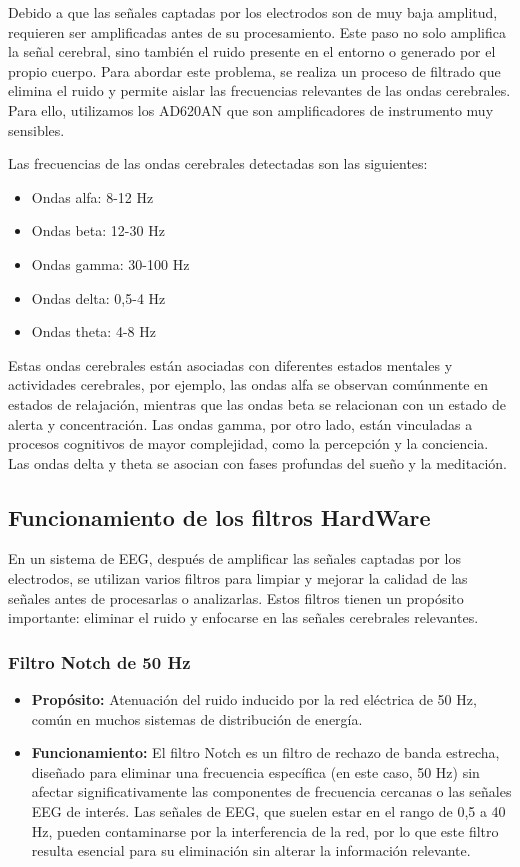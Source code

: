 \documentclass{article}
\begin{document}
Debido a que las señales captadas por los electrodos son de muy baja amplitud, requieren ser amplificadas antes de su procesamiento. Este paso no solo amplifica la señal cerebral, sino también el ruido presente en el entorno o generado por el propio cuerpo. Para abordar este problema, se realiza un proceso de filtrado que elimina el ruido y permite aislar las frecuencias relevantes de las ondas cerebrales. Para ello, utilizamos los AD620AN que son amplificadores de instrumento muy sensibles.

Las frecuencias de las ondas cerebrales detectadas son las siguientes:

\begin{itemize}
    \item Ondas alfa: 8-12 Hz
    \item Ondas beta: 12-30 Hz
    \item Ondas gamma: 30-100 Hz
    \item Ondas delta: 0,5-4 Hz
    \item Ondas theta: 4-8 Hz
\end{itemize}

Estas ondas cerebrales están asociadas con diferentes estados mentales y actividades cerebrales, por ejemplo, las ondas alfa se observan comúnmente en estados de relajación, mientras que las ondas beta se relacionan con un estado de alerta y concentración. Las ondas gamma, por otro lado, están vinculadas a procesos cognitivos de mayor complejidad, como la percepción y la conciencia. Las ondas delta y theta se asocian con fases profundas del sueño y la meditación.

\subsection{Funcionamiento de los filtros HardWare}

En un sistema de EEG, después de amplificar las señales captadas por los electrodos, se utilizan varios filtros para limpiar y mejorar la calidad de las señales antes de procesarlas o analizarlas. Estos filtros tienen un propósito importante: eliminar el ruido y enfocarse en las señales cerebrales relevantes. 

\subsubsection{Filtro Notch de 50 Hz}
\begin{itemize}
    \item \textbf{Propósito:} Atenuación del ruido inducido por la red eléctrica de 50 Hz, común en muchos sistemas de distribución de energía.
    \item \textbf{Funcionamiento:} El filtro Notch es un filtro de rechazo de banda estrecha, diseñado para eliminar una frecuencia específica (en este caso, 50 Hz) sin afectar significativamente las componentes de frecuencia cercanas o las señales EEG de interés. Las señales de EEG, que suelen estar en el rango de 0,5 a 40 Hz, pueden contaminarse por la interferencia de la red, por lo que este filtro resulta esencial para su eliminación sin alterar la información relevante.
\end{itemize}
\end{document}

